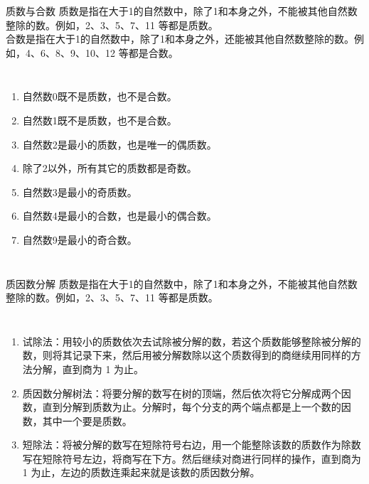 \documentclass[aspectratio=169]{ctexbeamer} %
\date{\today}
\begin{document}
\begin{frame}[t]{质数与合数}
\alert{质数}是指在\alert{大于1的自然数}中，除了\alert{1和本身}之外，\alert{不能}被其他自然数整除的数。例如，2、3、5、7、11 等都是质数。\\
\alert{合数}是指在\alert{大于1的自然数}中，除了\alert{1和本身}之外，\alert{还能}被其他自然数整除的数。例如，4、6、8、9、10、12 等都是合数。
\begin{columns}
\begin{enumerate}[label={\arabic*.}]
\item 自然数0既\alert{不是质数}，也\alert{不是合数}。 
\item 自然数1既\alert{不是质数}，也\alert{不是合数}。 
\item 自然数2是最小的\alert{质数}，也是唯一的\alert{偶质数}。 
\item \alert{除了2以外}，所有其它的质数都是\alert{奇数}。 
\item 自然数3是最小的\alert{奇质数}。 
\item 自然数4是最小的\alert{合数}，也是最小的\alert{偶合数}。 
\item 自然数9是最小的\alert{奇合数}。
\end{enumerate}
\end{columns}
\end{frame}

\begin{frame}[t]{质因数分解}
\alert{质数}是指在\alert{大于1的自然数}中，除了\alert{1和本身}之外，\alert{不能}被其他自然数整除的数。例如，2、3、5、7、11 等都是质数。
\begin{columns}
\begin{enumerate}[label={\arabic*.}]
\item \alert{试除法：}用较小的质数依次去试除被分解的数，若这个质数能够整除被分解的数，则将其记录下来，然后用被分解数除以这个质数得到的商继续用同样的方法分解，直到商为 1 为止。
\item \alert{质因数分解树法：}将要分解的数写在树的顶端，然后依次将它分解成两个因数，直到分解到质数为止。分解时，每个分支的两个端点都是上一个数的因数，其中一个要是质数。
\item \alert{短除法：}将被分解的数写在短除符号右边，用一个能整除该数的质数作为除数写在短除符号左边，将商写在下方。然后继续对商进行同样的操作，直到商为 1 为止，左边的质数连乘起来就是该数的质因数分解。

\end{enumerate}
\end{columns}
\end{frame}
\end{document}
